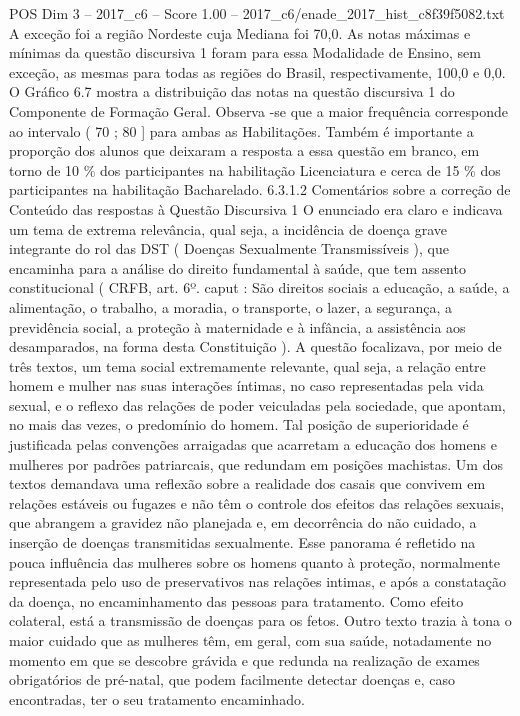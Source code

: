 \begin{textsample}{POS Dim 3 – 2017\_c6 – Score 1.00 – 2017\_c6/enade\_2017\_hist\_c8f39f5082.txt}
A exceção foi a região Nordeste cuja Mediana foi 70,0.
As notas máximas e mínimas da questão discursiva 1 foram para essa Modalidade de Ensino, sem exceção, as mesmas para todas as regiões do Brasil, respectivamente, 100,0 e 0,0.
O Gráfico 6.7 mostra a distribuição das notas na questão discursiva 1 do Componente de Formação Geral.
Observa -se que a maior frequência corresponde ao intervalo ( 70 ; 80 ] para ambas as Habilitações.
Também é importante a proporção dos alunos que deixaram a resposta a essa questão em branco, em torno de 10 \% dos participantes na habilitação Licenciatura e cerca de 15 \% dos participantes na habilitação Bacharelado. 6.3.1.2 Comentários sobre a correção de Conteúdo das respostas à Questão Discursiva 1 O enunciado era claro e indicava um tema de extrema relevância, qual seja, a incidência de doença grave integrante do rol das DST ( Doenças Sexualmente Transmissíveis ), que encaminha para a análise do direito fundamental à saúde, que tem assento constitucional ( CRFB, art. 6º. caput : São direitos sociais a educação, a saúde, a alimentação, o trabalho, a moradia, o transporte, o lazer, a segurança, a previdência social, a proteção à maternidade e à infância, a assistência aos desamparados, na forma desta Constituição ).
A questão focalizava, por meio de três textos, um tema social extremamente relevante, qual seja, a relação entre homem e mulher nas suas interações íntimas, no caso representadas pela vida sexual, e o reflexo das relações de poder veiculadas pela sociedade, que apontam, no mais das vezes, o predomínio do homem.
Tal posição de superioridade é justificada pelas convenções arraigadas que acarretam a educação dos homens e mulheres por padrões patriarcais, que redundam em posições machistas.
Um dos textos demandava uma reflexão sobre a realidade dos casais que convivem em relações estáveis ou fugazes e não têm o controle dos efeitos das relações sexuais, que abrangem a gravidez não planejada e, em decorrência do não cuidado, a inserção de doenças transmitidas sexualmente.
Esse panorama é refletido na pouca influência das mulheres sobre os homens quanto à proteção, normalmente representada pelo uso de preservativos nas relações intimas, e após a constatação da doença, no encaminhamento das pessoas para tratamento.
Como efeito colateral, está a transmissão de doenças para os fetos.
Outro texto trazia à tona o maior cuidado que as mulheres têm, em geral, com sua saúde, notadamente no momento em que se descobre grávida e que redunda na realização de exames obrigatórios de pré-natal, que podem facilmente detectar doenças e, caso encontradas, ter o seu tratamento encaminhado.

\end{textsample}
